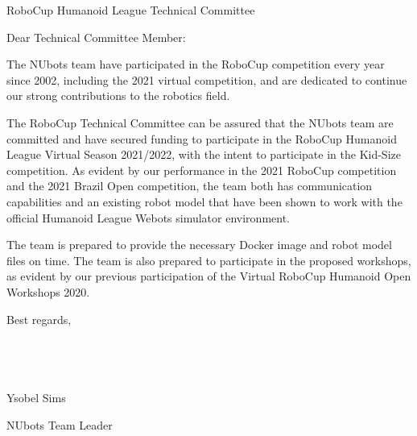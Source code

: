 \documentclass{letter}
\begin{document}
\begin{letter}{RoboCup Humanoid League Technical Committee}
\opening{Dear Technical Committee Member:}

The NUbots team have participated in the RoboCup competition every year since 2002, including the 2021 virtual competition, and are dedicated to continue our strong contributions to the robotics field.

The RoboCup Technical Committee can be assured that the NUbots team are committed and have secured funding to participate in the RoboCup Humanoid League Virtual Season 2021/2022, with the intent to participate in the Kid-Size competition. As evident by our performance in the 2021 RoboCup competition and the 2021 Brazil Open competition, the team both has communication capabilities and an existing robot model that have been shown to work with the official Humanoid League Webots simulator environment.

The team is prepared to provide the necessary Docker image and robot model files on time. The team is also prepared to participate in the proposed workshops, as evident by our previous participation of the Virtual RoboCup Humanoid Open Workshops 2020.

Best regards, \\ \\ \\ \\ \\ 

\hspace*{20pt} Ysobel Sims

NUbots Team Leader

\end{letter}
\end{document}
